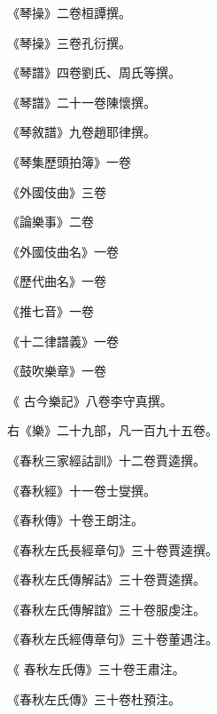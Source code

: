 \begin{pinyinscope}
 《琴操》二卷桓譚撰。



 《琴操》三卷孔衍撰。



 《琴譜》四卷劉氏、周氏等撰。



 《琴譜》二十一卷陳懷撰。



 《琴敘譜》九卷趙耶律撰。



 《琴集歷頭拍簿》一卷



 《外國伎曲》三卷



 《論樂事》二卷



 《外國伎曲名》一卷



 《歷代曲名》一卷



 《推七音》一卷



 《十二律譜義》一卷



 《鼓吹樂章》一卷



 《
 古今樂記》八卷李守真撰。



 右《樂》二十九部，凡一百九十五卷。



 《春秋三家經詁訓》十二卷賈逵撰。



 《春秋經》十一卷士燮撰。



 《春秋傳》十卷王朗注。



 《春秋左氏長經章句》三十卷賈逵撰。



 《春秋左氏傳解詁》三十卷賈逵撰。



 《春秋左氏傳解誼》三十卷服虔注。



 《春秋左氏經傳章句》三十卷董遇注。



 《
 春秋左氏傳》三十卷王肅注。



 《春秋左氏傳》三十卷杜預注。




\end{pinyinscope}

